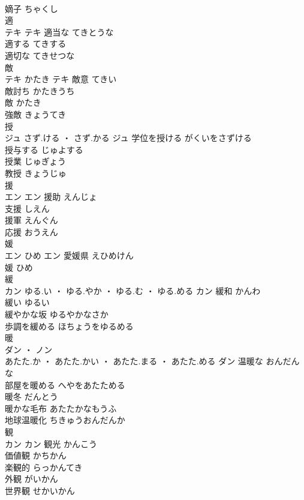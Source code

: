 \documentclass[8pt]{extreport}
\begin{document}
\begin{CJK}{UTF8}{min}
\\	嫡子	ちゃくし	
\\	適	
\\	テキ		テキ	適当な	てきとうな	
\\	適する	てきする	
\\	適切な	てきせつな	
\\	敵	
\\	テキ	かたき	テキ	敵意	てきい	
\\	敵討ち	かたきうち	
\\	敵	かたき	
\\	強敵	きょうてき	
\\	授	
\\	ジュ	さず.ける ・ さず.かる	ジュ	学位を授ける	がくいをさずける	
\\	授与する	じゅよする	
\\	授業	じゅぎょう	
\\	教授	きょうじゅ	
\\	援	
\\	エン		エン	援助	えんじょ	
\\	支援	しえん	
\\	援軍	えんぐん	
\\	応援	おうえん	
\\	媛	
\\	エン	ひめ	エン													愛媛県	えひめけん	
\\	媛	ひめ	
\\	緩	
\\	カン	ゆる.い ・ ゆる.やか ・ ゆる.む ・ ゆる.める	カン	緩和	かんわ	
\\	緩い	ゆるい	
\\	緩やかな坂	ゆるやかなさか	
\\	歩調を緩める	ほちょうをゆるめる	
\\	暖	
\\	ダン ・ ノン
\\	あたた.か ・ あたた.かい ・ あたた.まる ・ あたた.める	ダン	温暖な	おんだんな	
\\	部屋を暖める	へやをあたためる	
\\	暖冬	だんとう	
\\	暖かな毛布	あたたかなもうふ	
\\	地球温暖化	ちきゅうおんだんか	
\\	観	
\\	カン		カン	観光	かんこう	
\\	価値観	かちかん	
\\	楽観的	らっかんてき	
\\	外観	がいかん	
\\	世界観	せかいかん	

\end{CJK}
\end{document}

